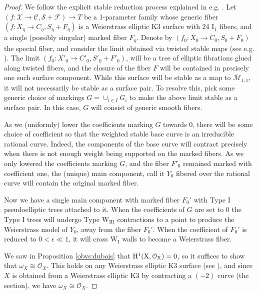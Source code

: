 \documentclass[11pt]{amsart}
\theoremstyle{definition}
\theoremstyle{remark}
\newcommand{\calO}{\mathcal O}
\newcommand{\calM}{\mathcal M}
\begin{document}
	\begin{proof}
		We follow the explicit stable reduction process explained in e.g. \cite[Section 6]{master}.  Let $(f: \mathscr{X} \to \mathscr{C}, \mathscr{S} + \mathscr{F}) \to T$ be a 1-parameter family whose generic fiber $(f: X_\eta \to C_\eta, S_\eta +  F_\eta)$ is a Weierstrass elliptic K3 surface with 24 $\mathrm{I}_1$ fibers, and a single (possibly singular) marked fiber $F_\eta$.  Denote by $(f_0: X_0 \to C_0, S_0 + F_0)$ the special fiber, and consider the limit obtained via twisted stable maps (see e.g. \cite{tsm}). The limit $(f_0 : X'_0 \to C'_0, S'_0 + F'_0)$, will be a tree of elliptic fibrations glued along twisted fibers, and the closure of the fiber $F$ will be contained in precisely one such surface component. While this surface will be stable as a map to $\overline{\calM}_{1,1}$, it will not necessarily be stable as a surface pair. To resolve this, pick some generic choice of markings $G = \cup_{i \in I} G_i$ to make the above limit stable as a surface pair. In this case, $G$ will consist of generic smooth fibers. 
		
		As we (uniformly) lower the coefficients marking $G$ towards 0, there will be some choice of coefficient so that the weighted stable base curve is an irreducible rational curve. Indeed, the components of the base curve will contract precisely when there is not enough weight being supported on the marked fibers. As we only lowered the coefficients marking $G$, and the fiber $F'_0$ remained marked with coefficient one, the (unique) main component, call it $Y_0$ fibered over the rational curve will contain the original marked fiber. 
		
		Now we have a single main component with marked fiber $F_0'$ with Type I pseudoelliptic trees attached to it. When the coefficients of $G$ are set to $0$ the Type I trees will undergo Type $\mathrm{W}_{\mathrm{III}}$ contractions to a point to produce the Weierstrass model of $Y_0$, away from the fiber $F_0'$. When the coefficient of $F_0'$ is reduced to $0 < \epsilon \ll 1$, it will cross $\mathrm{W}_{\mathrm{I}}$ walls to become a Weierstrass fiber.  
		
		
		We saw in Proposition \ref{obvs:dubois} that $\rm{H}^1(X, \calO_X) = 0$, so it suffices to show that $\omega_X \cong \calO_X$. This holds on any Weierstrass elliptic K3 surface (see \cite[Proposition III.1.1]{mir3}), and since $X$ is obtained from a Weierstrass elliptic K3 by contracting a $(-2)$ curve (the section), we have $\omega_X \cong \calO_X$. 
	\end{proof}
	
\end{document}
